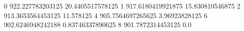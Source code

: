 0 922.227783203125 20.4405517578125
1 917.6180419921875 15.830810546875
2 913.3653564453125 11.578125
4 905.7564697265625 3.96923828125
6 902.6246948242188 0.83746337890625
8 901.7872314453125 0.0
